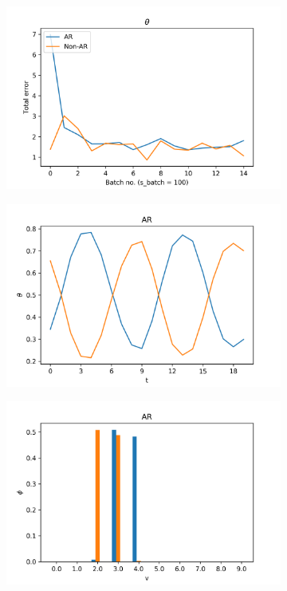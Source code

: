 \documentclass[12pt]{article}
\begin{document}
\begin{figure}[H]
\end{figure}

\begin{figure}[H]
  \centering
  \begin{subfigure}[b]{0.3\textwidth}
    \includegraphics[width=\linewidth]{performance_thetas_experiment-1|overlapping-yes_dataset-8.png}
  \end{subfigure}%
  \begin{subfigure}[b]{0.3\textwidth}
    \includegraphics[width=\linewidth]{latent_thetas_AR_experiment-1|overlapping-yes_dataset-8.png}
  \end{subfigure}%
  \begin{subfigure}[b]{0.3\textwidth}
    \includegraphics[width=\linewidth]{latent_phis_AR_experiment-1|overlapping-yes_dataset-8.png}

\end{subfigure}
\end{figure}
\end{document}
